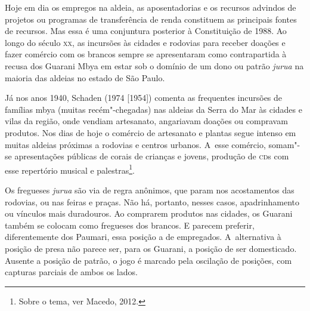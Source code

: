 Hoje em dia os empregos na aldeia, as aposentadorias e os recursos
advindos de projetos ou programas de transferência de renda constituem
as principais fontes de recursos. Mas essa é uma conjuntura posterior à
Constituição de 1988. Ao longo do século \textsc{xx}, as incursões às cidades e
rodovias para receber doações e fazer comércio com os brancos sempre se
apresentaram como contrapartida à recusa dos Guarani Mbya em estar sob
o domínio de um dono ou patrão \emph{jurua} na maioria das aldeias no estado
de São Paulo. 

Já nos anos 1940, Schaden (1974 [1954]) comenta as frequentes incursões
de famílias mbya (muitas recém"-chegadas) nas aldeias da Serra do Mar às
cidades e vilas da região, onde vendiam artesanato, angariavam doações
ou compravam produtos. Nos dias de hoje o comércio de artesanato e
plantas segue intenso em muitas aldeias próximas a rodovias e centros
urbanos. A~esse comércio, somam"-se apresentações públicas de corais de
crianças e jovens, produção de \textsc{cd}s com esse repertório musical e
palestras\footnote{Sobre o tema, ver Macedo, 2012.}. 

Os fregueses \emph{jurua} são via de regra anônimos, que param nos acostamentos
das rodovias, ou nas feiras e praças. Não há, portanto, nesses casos,
apadrinhamento ou vínculos mais duradouros. Ao comprarem produtos nas
cidades, os Guarani também se colocam como fregueses dos brancos. E
parecem preferir, diferentemente dos Paumari, essa posição a de
empregados. A~alternativa à posição de presa não parece ser, para os
Guarani, a posição de ser domesticado. Ausente a posição de patrão, o
jogo é marcado pela oscilação de posições, com capturas parciais de
ambos os lados.

